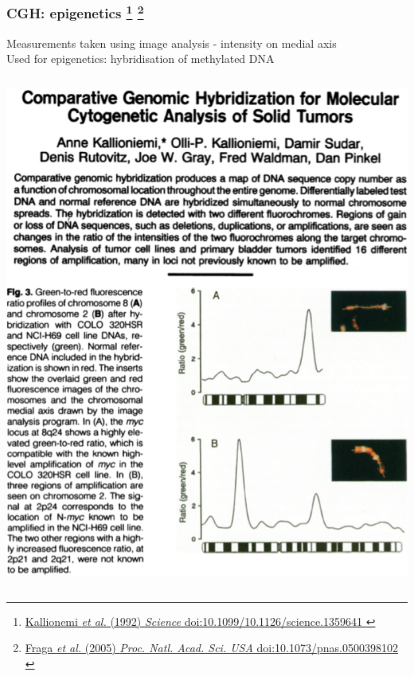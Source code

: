 %
\begin{frame}
  \frametitle{CGH: epigenetics
  \footnote{\tiny{\href{http://dx.doi.org/10.1126/science.1359641
}{Kallionemi \textit{et al.} (1992) \textit{Science} doi:10.1099/10.1126/science.1359641
}}}
  \footnote{\tiny{\href{http://dx.doi.org/10.1073/pnas.0500398102
}{Fraga \textit{et al.} (2005) \textit{Proc. Natl. Acad. Sci. USA} doi:10.1073/pnas.0500398102
}}}
  }
  Measurements taken using image analysis - intensity on medial axis \\
  \textcolor{hutton_green}{Used for epigenetics: hybridisation of methylated DNA} \\
  \begin{columns}[T] 
      \includegraphics[width=\textwidth]{images/cgh_paper}

\end{columns}
\end{frame}
